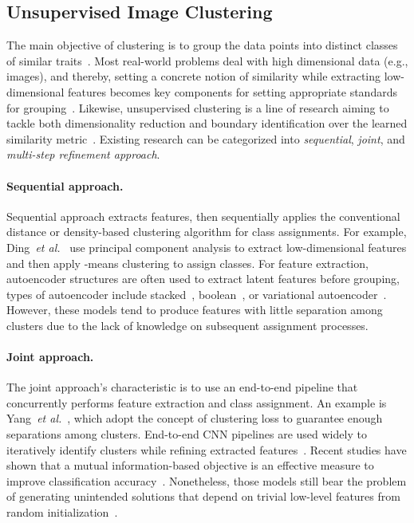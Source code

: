 \documentclass[final]{cvpr}
\newcommand{\cutparagraphup}{\vspace*{-0.15in}}
\begin{document}
\subsection{Unsupervised Image Clustering}
The main objective of clustering is to group the data points into distinct classes of similar traits~\cite{jain1999data}. Most real-world problems deal with high dimensional data (e.g., images), and thereby, setting a concrete notion of similarity while extracting low-dimensional features becomes key components for setting appropriate standards for grouping~\cite{xie2016unsupervised}. Likewise, unsupervised clustering is a line of research aiming to tackle both dimensionality reduction and boundary identification over the learned similarity metric~\cite{hanmitigating}. Existing research can be categorized into \emph{sequential}, \emph{joint}, and \emph{multi-step refinement approach}.
\cutparagraphup
\paragraph{Sequential approach.} Sequential approach extracts features, then sequentially applies the conventional distance or density-based clustering algorithm for class assignments. For example, Ding~\emph{et al.}~\cite{ding2004k} use principal component analysis to extract low-dimensional features and then apply -means clustering to assign classes. For feature extraction, autoencoder structures are often used to extract latent features before grouping, types of autoencoder include stacked~\cite{vincent2010stacked}, boolean~\cite{baldi2012autoencoders}, or variational autoencoder~\cite{kingma2013auto}. However, these models tend to produce features with little separation among clusters due to the lack of knowledge on subsequent assignment processes. 
\cutparagraphup
\paragraph{Joint approach.} The joint approach's characteristic is to use an end-to-end pipeline that concurrently performs feature extraction and class assignment. An example is Yang~\emph{et al.}~\cite{yang2017towards}, which adopt the concept of clustering loss to guarantee enough separations among clusters. End-to-end CNN pipelines are used widely to iteratively identify clusters while refining extracted features~\cite{caron2018deep,chang2017deep,xie2016unsupervised}. Recent studies have shown that a mutual information-based objective is an effective measure to improve classification accuracy~\cite{hu2017learning,ji2019invariant}. Nonetheless, those models still bear the problem of generating unintended solutions that depend on trivial low-level features from random initialization~\cite{hanmitigating}. 
\cutparagraphup
\end{document}
